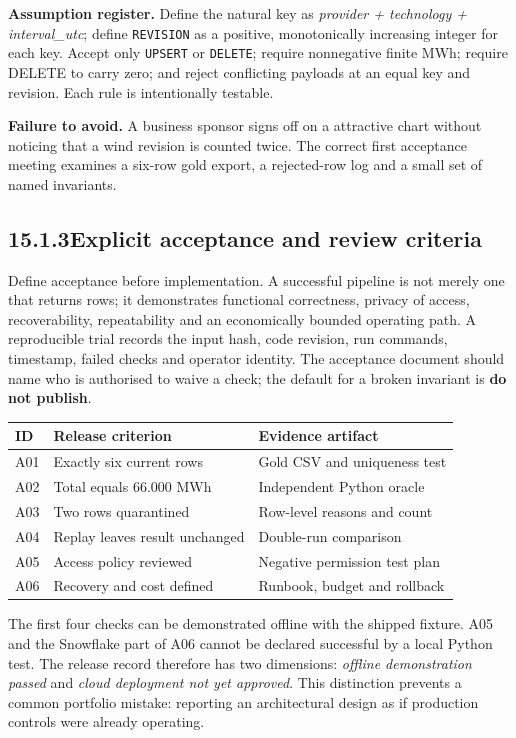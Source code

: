 \documentclass[11pt,twoside]{article}
\newcommand{\topic}[2]{\subsection*{#1\quad #2}}
\begin{document}
\begin{insight}\textbf{Assumption register.} Define the natural key as \emph{provider + technology + interval\_utc}; define \texttt{REVISION} as a positive, monotonically increasing integer for each key. Accept only \texttt{UPSERT} or \texttt{DELETE}; require nonnegative finite MWh; require DELETE to carry zero; and reject conflicting payloads at an equal key and revision. Each rule is intentionally testable.\end{insight}
\textbf{Failure to avoid.} A business sponsor signs off on a attractive chart without noticing that a wind revision is counted twice. The correct first acceptance meeting examines a six-row gold export, a rejected-row log and a small set of named invariants.

\newpage

\topic{15.1.3}{Explicit acceptance and review criteria}
Define acceptance before implementation. A successful pipeline is not merely one that returns rows; it demonstrates functional correctness, privacy of access, recoverability, repeatability and an economically bounded operating path. A reproducible trial records the input hash, code revision, run commands, timestamp, failed checks and operator identity. The acceptance document should name who is authorised to waive a check; the default for a broken invariant is \textbf{do not publish}.
\begin{center}\small\begin{tabularx}{\linewidth}{@{}p{11mm}p{36mm}X@{}}\toprule
ID & Release criterion & Evidence artifact\\\midrule
A01 & Exactly six current rows & Gold CSV and uniqueness test\\
A02 & Total equals 66.000 MWh & Independent Python oracle\\
A03 & Two rows quarantined & Row-level reasons and count\\
A04 & Replay leaves result unchanged & Double-run comparison\\
A05 & Access policy reviewed & Negative permission test plan\\
A06 & Recovery and cost defined & Runbook, budget and rollback\\\bottomrule
\end{tabularx}\end{center}
The first four checks can be demonstrated offline with the shipped fixture. A05 and the Snowflake part of A06 cannot be declared successful by a local Python test. The release record therefore has two dimensions: \emph{offline demonstration passed} and \emph{cloud deployment not yet approved}. This distinction prevents a common portfolio mistake: reporting an architectural design as if production controls were already operating.
\end{document}
